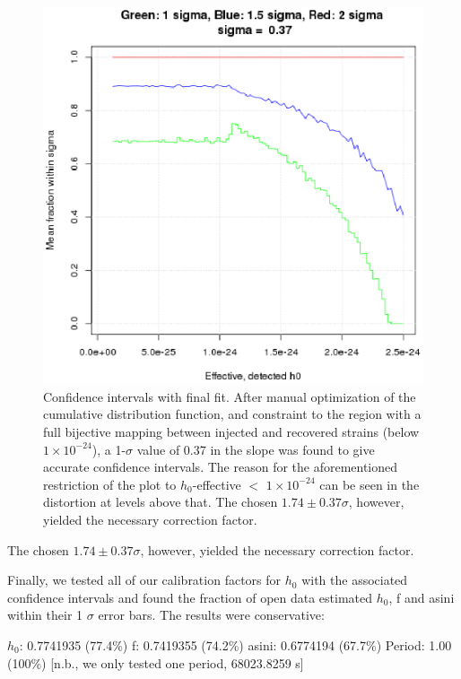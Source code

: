 \begin{figure}
\begin{center}
\includegraphics[width=0.5\paperwidth,height=0.35\paperheight]{PlotSigmaDiffVsH0Eff.eps}
\caption{Confidence intervals with final fit. After manual optimization of the cumulative distribution function, and constraint to the region with a full bijective mapping between injected and recovered strains (below $1 \times 10^{-24}$), a 1-$\sigma$ value of 0.37 in the slope was found to give accurate confidence intervals.
The reason for the aforementioned restriction of the plot to $h_0$-effective $<$ $1 \times 10^{-24}$ can be seen in the distortion at levels above that. 
The chosen $1.74 \pm 0.37 \sigma$, however, yielded the necessary correction factor. \label{fig:plotsigmadiffvsh0eff}
}
\end{center}
\end{figure}

The chosen $1.74 \pm 0.37 \sigma$, however, yielded the necessary correction factor.

Finally, we tested all of our calibration factors for $h_0$ with the associated confidence intervals and found the fraction of open data estimated $h_0$, f and asini within their 1 $\sigma$ error bars. The results were conservative:

$h_0$: 0.7741935 (77.4\%)
f: 0.7419355 (74.2\%)
asini: 0.6774194 (67.7\%)
Period: 1.00 (100\%) [n.b., we only tested one period, 68023.8259 s]

